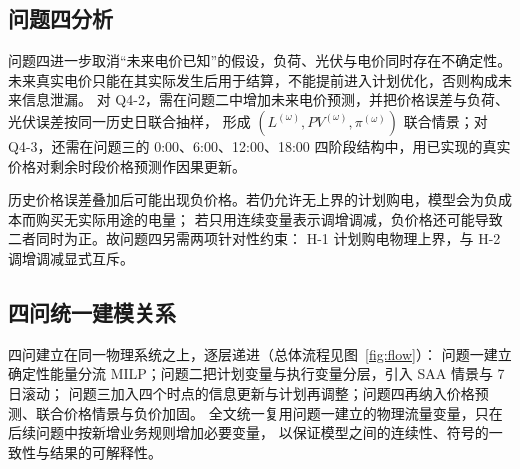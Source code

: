 \subsection{问题四分析}

问题四进一步取消“未来电价已知”的假设，负荷、光伏与电价同时存在不确定性。
未来真实电价只能在其实际发生后用于结算，不能提前进入计划优化，否则构成未来信息泄漏。
对 Q4-2，需在问题二中增加未来电价预测，并把价格误差与负荷、光伏误差按同一历史日联合抽样，
形成 \((L^{(\omega)},PV^{(\omega)},\pi^{(\omega)})\) 联合情景；对 Q4-3，还需在问题三的
0:00、6:00、12:00、18:00 四阶段结构中，用已实现的真实价格对剩余时段价格预测作因果更新。

历史价格误差叠加后可能出现负价格。若仍允许无上界的计划购电，模型会为负成本而购买无实际用途的电量；
若只用连续变量表示调增调减，负价格还可能导致二者同时为正。故问题四另需两项针对性约束：
H-1 计划购电物理上界，与 H-2 调增调减显式互斥。

\subsection{四问统一建模关系}

四问建立在同一物理系统之上，逐层递进（总体流程见图~\ref{fig:flow}）：
问题一建立确定性能量分流 MILP；问题二把计划变量与执行变量分层，引入 SAA 情景与 7 日滚动；
问题三加入四个时点的信息更新与计划再调整；问题四再纳入价格预测、联合价格情景与负价加固。
全文统一复用问题一建立的物理流量变量，只在后续问题中按新增业务规则增加必要变量，
以保证模型之间的连续性、符号的一致性与结果的可解释性。

